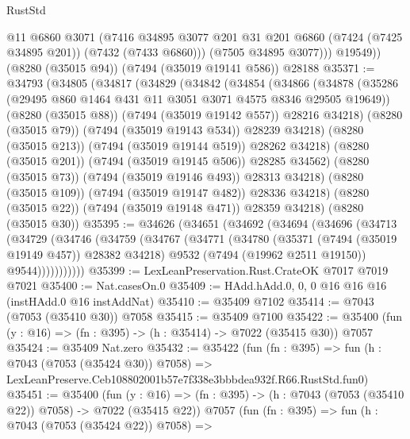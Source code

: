 \begin{lexlean}{RustStd}
\begin{coremodule}
            @11
            @6860
            @3071
            (@7416
              @34895
              @3077
              @201
              @31
              @201
              @6860
              (@7424 (@7425 @34895 @201))
              (@7432 (@7433 @6860)))
            (@7505 @34895 @3077)))
        @19549))
    (@8280 (@35015 @94))
    (@7494 (@35019 @19141 @586))
    @28188
@35371 := @34793
    (@34805
      (@34817
        (@34829
          (@34842
            (@34854
              (@34866
                (@34878
                  (@35286 (@29495 @860 @1464 @431 @11 @3051 @3071 @4575 @8346 @29505 @19649))
                  (@8280 (@35015 @88))
                  (@7494 (@35019 @19142 @557))
                  @28216
                  @34218)
                (@8280 (@35015 @79))
                (@7494 (@35019 @19143 @534))
                @28239
                @34218)
              (@8280 (@35015 @213))
              (@7494 (@35019 @19144 @519))
              @28262
              @34218)
            (@8280 (@35015 @201))
            (@7494 (@35019 @19145 @506))
            @28285
            @34562)
          (@8280 (@35015 @73))
          (@7494 (@35019 @19146 @493))
          @28313
          @34218)
        (@8280 (@35015 @109))
        (@7494 (@35019 @19147 @482))
        @28336
        @34218)
      (@8280 (@35015 @22))
      (@7494 (@35019 @19148 @471))
      @28359
      @34218)
    (@8280 (@35015 @30))
@35395 := @34626
    (@34651
      (@34692
        (@34694
          (@34696
            (@34713
              (@34729
                (@34746
                  (@34759
                    (@34767
                      (@34771
                        (@34780
                          (@35371 (@7494 (@35019 @19149 @457)) @28382 @34218)
                          @9532
                          (@7494 (@19962 @2511 @19150))
                          @9544)))))))))))
@35399 := LexLeanPreservation.Rust.CrateOK @7017 @7019 @7021
@35400 := Nat.casesOn.{0}
@35409 := HAdd.hAdd.{0, 0, 0} @16 @16 @16 (instHAdd.{0} @16 instAddNat)
@35410 := @35409 @7102
@35414 := @7043 (@7053 (@35410 @30)) @7058
@35415 := @35409 @7100
@35422 := @35400 (fun (y : @16) => (fn : @395) -> (h : @35414) -> @7022 (@35415 @30)) @7057
@35424 := @35409 Nat.zero
@35432 := @35422
    (fun (fn : @395) =>
    fun (h : @7043 (@7053 (@35424 @30)) @7058) =>
    LexLeanPreserve.Ceb108802001b57e7f338e3bbbdea932f.R66.RustStd.fun0)
@35451 := @35400
    (fun (y : @16) => (fn : @395) -> (h : @7043 (@7053 (@35410 @22)) @7058) -> @7022 (@35415 @22))
    @7057
    (fun (fn : @395) =>
    fun (h : @7043 (@7053 (@35424 @22)) @7058) =>

\end{coremodule}
\end{lexlean}
